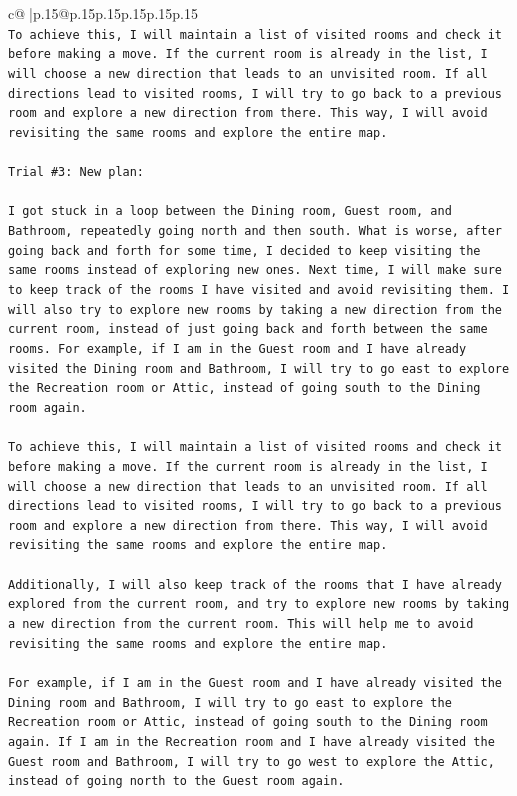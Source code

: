 \documentclass{article}
\begin{document}
{\begin{supertabular}{c@{$\;$}|p{.15\linewidth}@{}p{.15\linewidth}p{.15\linewidth}p{.15\linewidth}p{.15\linewidth}p{.15\linewidth}}
{{{\\ 
\texttt{To achieve this, I will maintain a list of visited rooms and check it before making a move. If the current room is already in the list, I will choose a new direction that leads to an unvisited room. If all directions lead to visited rooms, I will try to go back to a previous room and explore a new direction from there. This way, I will avoid revisiting the same rooms and explore the entire map.} \\
\\ 
\texttt{Trial \#3: New plan: } \\
\\ 
\texttt{I got stuck in a loop between the Dining room, Guest room, and Bathroom, repeatedly going north and then south. What is worse, after going back and forth for some time, I decided to keep visiting the same rooms instead of exploring new ones. Next time, I will make sure to keep track of the rooms I have visited and avoid revisiting them. I will also try to explore new rooms by taking a new direction from the current room, instead of just going back and forth between the same rooms. For example, if I am in the Guest room and I have already visited the Dining room and Bathroom, I will try to go east to explore the Recreation room or Attic, instead of going south to the Dining room again.} \\
\\ 
\texttt{To achieve this, I will maintain a list of visited rooms and check it before making a move. If the current room is already in the list, I will choose a new direction that leads to an unvisited room. If all directions lead to visited rooms, I will try to go back to a previous room and explore a new direction from there. This way, I will avoid revisiting the same rooms and explore the entire map.} \\
\\ 
\texttt{Additionally, I will also keep track of the rooms that I have already explored from the current room, and try to explore new rooms by taking a new direction from the current room. This will help me to avoid revisiting the same rooms and explore the entire map.} \\
\\ 
\texttt{For example, if I am in the Guest room and I have already visited the Dining room and Bathroom, I will try to go east to explore the Recreation room or Attic, instead of going south to the Dining room again. If I am in the Recreation room and I have already visited the Guest room and Bathroom, I will try to go west to explore the Attic, instead of going north to the Guest room again.} \\
}}}
\end{supertabular}}
\end{document}
